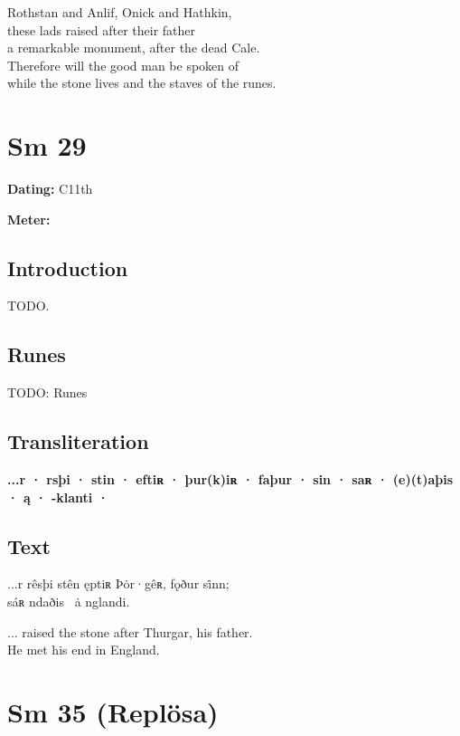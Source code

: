 \bvb Rothstan and Anlif, Onick and Hathkin, \\
these lads raised after their father \\
a remarkable monument, after the dead Cale. \\
Therefore will the good man be spoken of \\
while the stone lives and the staves of the runes.\evb\evg

\sectionline\clearpage


\section{Sm 29}

\begin{flushright}%
\textbf{Dating:} C11th

\textbf{Meter:} \Fornyrdislag
\end{flushright}%

\subsection{Introduction}

TODO.

\subsection{Runes}

TODO: Runes%

\subsection{Transliteration}

\textbf{...r · rsþi · stin · eftiʀ · þur(k)iʀ · faþur · sin · saʀ · (e)(t)aþis · ą · -klanti ·}

\subsection{Text}

\bpg\bpa[0]%
...r rêsþi stên ęptiʀ Þȯr·gêʀ, fǫður si̇nn; \\
sáʀ ndaðis \hld\ ȧ \emph{}nglandi.\epa

\bpb ... raised the stone after Thurgar, his father. \\
He met his end in England.\epb\epg

\sectionline\clearpage


\section{Sm 35 (Replösa)}

